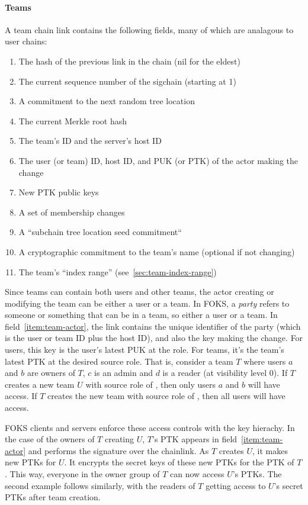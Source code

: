 \paragraph{Teams} A team chain link contains the following fields, many of which
are analagous to user chains:

\begin{enumerate}[label=T.\arabic*]\itemsep0em
    \item The hash of the previous link in the chain (nil for the eldest)
    \item The current sequence number of the sigchain (starting at 1)
    \item A commitment to the next random tree location
      \label{item:next-tree-location}
    \item The current Merkle root hash 
    \item The team's ID and the server's host ID
    \item The user (or team) ID, host ID, and PUK (or PTK) of the actor making the change
       \label{item:team-actor}
    \item New PTK public keys
    \item \label{item:membership} A set of membership changes
    \item A ``subchain tree location seed commitment``
    \item A cryptographic commitment to the team's name (optional if not changing)
    \item The team's ``index range'' (see~\ref{sec:team-index-range})
\end{enumerate}

Since teams can contain both users and other teams, the actor creating or
modifying the team can be either a user or a team. In FOKS, a \textit{party}
refers to someone or something that can be in a team, so either a user or a
team. In field~\ref{item:team-actor}, the link contains the unique identifier of
the party (which is the user or team ID plus the host ID), and also the key
making the change. For users, this key is the user's latest PUK at the \owner{}
role.  For teams, it's the team's latest PTK at the desired source role. That
is, consider a team $T$  where users $a$ and $b$ are owners of $T$, $c$ is an
admin and $d$ is a reader (at visibility level 0). If $T$ creates a new team $U$
with source role of \owner, then only users $a$ and $b$ will have access. If
$T$ creates the new team with source role of \reader, then all users will have
access. 

FOKS clients and servers enforce these access controls with the key hierachy.
In the case of the owners of $T$ creating $U$, $T$'s \owner{} PTK appears in
field~\ref{item:team-actor} and performs the signature over the chainlink. 
As $T$ creates $U$, it makes new PTKs for $U$. It encrypts the secret keys
of these new PTKs for the \owner{} PTK of $T$. This way, everyone in the owner
group of $T$ can now access $U$'s PTKs. The second example follows similarly,
with the readers of $T$ getting access to $U$'s secret PTKs after team creation.

